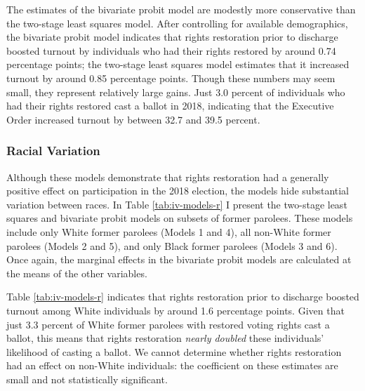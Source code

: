 \documentclass[12pt,]{article}
\begin{document}
The estimates of the bivariate probit model are modestly more conservative than the two-stage least squares model. After controlling for available demographics, the bivariate probit model indicates that rights restoration prior to discharge boosted turnout by individuals who had their rights restored by around 0.74 percentage points; the two-stage least squares model estimates that it increased turnout by around 0.85 percentage points. Though these numbers may seem small, they represent relatively large gains. Just 3.0 percent of individuals who had their rights restored cast a ballot in 2018, indicating that the Executive Order increased turnout by between 32.7 and 39.5 percent.

\hypertarget{racial-variation}{%
\subsubsection*{Racial Variation}\label{racial-variation}}

Although these models demonstrate that rights restoration had a generally positive effect on participation in the 2018 election, the models hide substantial variation between races. In Table \ref{tab:iv-models-r} I present the two-stage least squares and bivariate probit models on subsets of former parolees. These models include only White former parolees (Models 1 and 4), all non-White former parolees (Models 2 and 5), and only Black former parolees (Models 3 and 6). Once again, the marginal effects in the bivariate probit models are calculated at the means of the other variables.



Table \ref{tab:iv-models-r} indicates that rights restoration prior to discharge boosted turnout among White individuals by around 1.6 percentage points. Given that just 3.3 percent of White former parolees with restored voting rights cast a ballot, this means that rights restoration \emph{nearly doubled} these individuals' likelihood of casting a ballot. We cannot determine whether rights restoration had an effect on non-White individuals: the coefficient on these estimates are small and not statistically significant.
\end{document}
